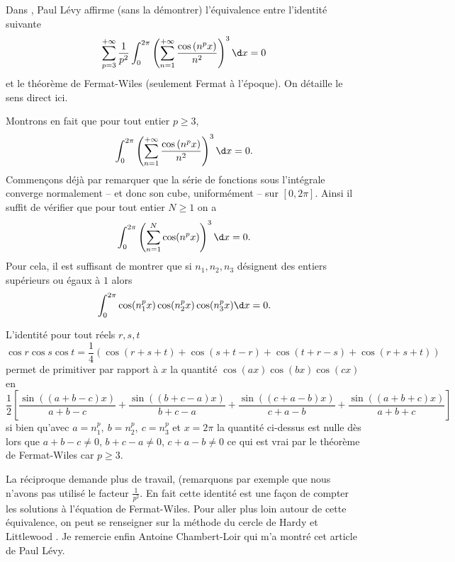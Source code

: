 \documentclass{notes}
\begin{document}

Dans \cite{Levy}, Paul Lévy affirme (sans la démontrer) l'équivalence entre l'identité suivante
\[ \sum_{p=3}^{+\infty} \frac{1}{p^{2}} \int_{0}^{2\pi} \left( \sum_{n=1}^{+\infty} \frac{\cos\left( n^{p }x \right)}{n^{2}} \right)^{3}  \d x = 0  \]
et le théorème de Fermat-Wiles (seulement Fermat à l'époque). On détaille le sens direct ici.

Montrons en fait que pour tout entier $p\geq 3$, 
\[ \int_{0}^{2\pi} \left( \sum_{n=1}^{+\infty} \frac{\cos\left( n^{p }x \right)}{n^{2}} \right)^{3}  \d x = 0 .  \]
Commençons déjà par remarquer que la série de fonctions sous l'intégrale converge normalement -- et donc son cube, uniformément -- sur $[0,2\pi]$. Ainsi il suffit de vérifier que pour tout entier $N\geq 1$ on a 
\[  \int_{0}^{2\pi}   \left( \sum_{n=1}^{N} \cos(n^{p}x) \right)^{3} \d x = 0. \]
Pour cela, il est suffisant de montrer que si $n_1,n_2,n_3$ désignent des entiers supérieurs ou égaux à $1$ alors 
\[ \int_{0}^{2\pi} \cos(n_1^{p} x)\cos(n_2^{p}x) \cos(n_3^{p}x) \d x = 0.\]

L'identité pour tout réels $r,s,t$ 
\[\cos r \cos s \cos t = \frac 14 \left( \cos(r+s+t)+\cos(s+t-r) + \cos(t+r-s) + \cos(r+s+t) \right)\]
permet de primitiver par rapport à $x$ la quantité $ \cos(ax)\cos(bx)\cos(cx) $  en 
\[ \frac 12 \left[    \frac{\sin \left( (a+b-c)x \right)  }{a+b-c} + \frac{\sin\left( (b+c-a)x \right)}{b+c-a}  + \frac{\sin\left( (c+a-b) x\right)  }{c+a-b} + \frac{\sin\left( (a+b+c)x \right)}{a+b+c}    \right] \]
si bien qu'avec $a=n_1^{p},\ b=n_2^{p},\ c=n_3^{p}$ et $x=2\pi$ la quantité ci-dessus est nulle dès lors que $a+b-c \neq 0$, $b+c-a \neq 0$, $c+a-b \neq 0$ ce qui est vrai par le théorème de Fermat-Wiles car $p \geq 3$.  


\begin{rem}
  La réciproque demande plus de travail, (remarquons par exemple que nous n'avons pas utilisé le facteur $\frac{1}{p^{2}}$. En fait cette identité est une façon de compter les solutions à l'équation de Fermat-Wiles. Pour aller plus loin autour de cette équivalence, on peut se renseigner sur la méthode du cercle de Hardy et Littlewood \cite{HW}.   Je remercie enfin Antoine Chambert-Loir qui m'a montré cet article de Paul Lévy.
\end{rem}





 
\end{document}
